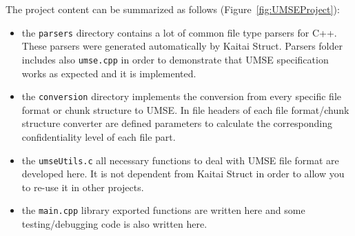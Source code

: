 The project content can be summarized as follows
(Figure~\ref{fig:UMSEProject}):
\begin{itemize}
\item the \texttt{parsers} directory contains a lot of common file type
  parsers for C++. These parsers were generated automatically by Kaitai
  Struct. Parsers folder includes also \texttt{umse.cpp} in order to
  demonstrate that UMSE specification works as expected and it is implemented.
\item the \texttt{conversion} directory implements the conversion from every
  specific file format or chunk structure to UMSE. In file headers of each
  file format/chunk structure converter are defined parameters to calculate
  the corresponding confidentiality level of each file part.
\item the \texttt{umseUtils.c} all necessary functions to deal with UMSE file
  format are developed here. It is not dependent from Kaitai Struct in order
  to allow you to re-use it in other projects.
\item the \texttt{main.cpp} library exported functions are written here and
  some testing/debugging code is also written here.
\end{itemize}

